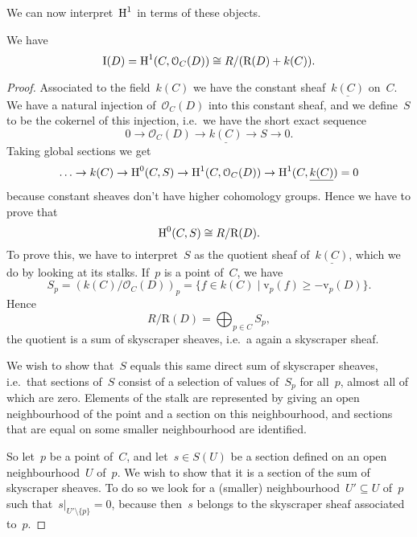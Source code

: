 \documentclass[10pt,a4paper]{article}
\begin{document}
We can now interpret~$\operatorname{H}^1$ in terms of these objects.
\begin{proposition}
  \label{proposition:HH1}
  We have
  \begin{equation}
    \mathrm{I}(D)=\operatorname{H}^1(C,\mathcal{O}_C(D))\cong R/(\mathrm{R}(D)+k(C)).
  \end{equation}

  \begin{proof}
    Associated to the field~$k(C)$ we have the constant sheaf~$\underline{k(C)}$ on~$C$. We have a natural injection of~$\mathcal{O}_C(D)$ into this constant sheaf, and we define~$S$ to be the cokernel of this injection, i.e.\ we have the short exact sequence
    \begin{equation}
      0\to\mathcal{O}_C(D)\to\underline{k(C)}\to S\to 0.
    \end{equation}
    Taking global sections we get
    \begin{equation}
      \dotso\to k(C)\to\operatorname{H}^0(C,S)\to\operatorname{H}^1(C,\mathcal{O}_C(D))\to\operatorname{H}^1(C,\underline{k(C)})=0
    \end{equation}
    because constant sheaves don't have higher cohomology groups. Hence we have to prove that
    \begin{equation}
      \operatorname{H}^0(C,S)\cong R/\mathrm{R}(D).
    \end{equation}
    To prove this, we have to interpret~$S$ as the quotient sheaf of~$\underline{k(C)}$, which we do by looking at its stalks. If~$p$ is a point of~$C$, we have
    \begin{equation}
      S_p=(k(C)/\mathcal{O}_C(D))_p=\{f\in k(C)\mid \mathrm{v}_p(f)\geq -\mathrm{v}_p(D)\}.
    \end{equation}
    Hence
    \begin{equation}
      R/\mathrm{R}(D)=\bigoplus_{p\in C}S_p,
    \end{equation}
    the quotient is a sum of skyscraper sheaves, i.e.\ a again a skyscraper sheaf.

    We wish to show that~$S$ equals this same direct sum of skyscraper sheaves, i.e.\ that sections of~$S$ consist of a selection of values of~$S_p$ for all~$p$, almost all of which are zero. Elements of the stalk are represented by giving an open neighbourhood of the point and a section on this neighbourhood, and sections that are equal on some smaller neighbourhood are identified.

    So let~$p$ be a point of~$C$, and let~$s\in S(U)$ be a section defined on an open neighbourhood~$U$ of~$p$. We wish to show that it is a section of the sum of skyscraper sheaves. To do so we look for a (smaller) neighbourhood~$U'\subseteq U$ of~$p$ such that~$s|_{U'\setminus\{p\}}=0$, because then~$s$ belongs to the skyscraper sheaf associated to~$p$.


\end{proof}
\end{proposition}
\end{document}
